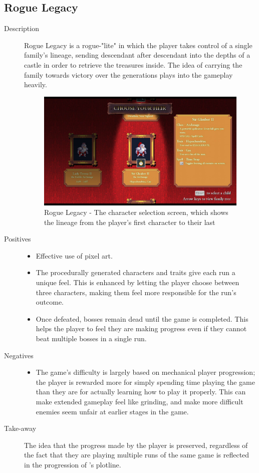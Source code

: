 \clearpage
\subsection{Rogue Legacy}
\begin{description}
\item[Description]{Rogue Legacy is a rogue-"lite" in which the player takes control of a single family's lineage, sending descendant after descendant into the depths of a castle in order to retrieve the treasures inside. The idea of carrying the family towards victory over the generations plays into the gameplay heavily.

\begin{figure}[htb]
	\centering\includegraphics[width=.25\linewidth]{images/game_rogue_legacy}
	\caption{Rogue Legacy - The character selection screen, which shows the lineage from the player's first character to their last}
	\label{fig:rogue_legacy}
\end{figure}}

\item[Positives]{
\begin{itemize}
\item{Effective use of pixel art.}
\item{The procedurally generated characters and traits give each run a unique feel. This is enhanced by letting the player choose between three characters, making them feel more responsible for the run's outcome.}
\item{Once defeated, bosses remain dead until the game is completed. This helps the player to feel they are making progress even if they cannot beat multiple bosses in a single run.}
\end{itemize}
}
\item[Negatives]{
\begin{itemize}
\item{The game's difficulty is largely based on mechanical player progression; the player is rewarded more for simply spending time playing the game than they are for actually learning how to play it properly. This can make extended gameplay feel like grinding, and make more difficult enemies seem unfair at earlier stages in the game.}
\end{itemize}
}
\item[Take-away]{The idea that the progress made by the player is preserved, regardless of the fact that they are playing multiple runs of the same game is reflected in the progression of \ourgame{}'s plotline.}
\end{description}



